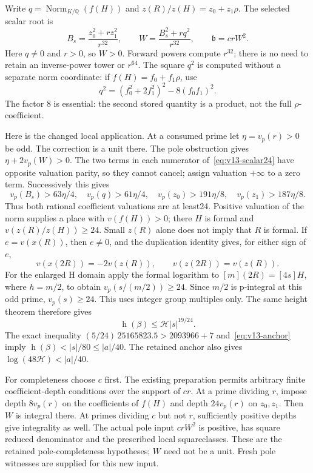 Write $q=\operatorname{Norm}_{K/\mathbb Q}(f(H))$ and
$z(R)/z(H)=z_0+z_1\rho$. The selected scalar root is
\begin{equation}\label{eq:v13-scalar24}
 B_s=\frac{z_0^2+r z_1^2}{r^{32}},\qquad
 W=\frac{B_s^2+r q^2}{r^{32}},\qquad \mathfrak b=crW^2.
\end{equation}
Here $q\ne0$ and $r>0$, so $W>0$. Forward powers compute $r^{32}$;
there is no need to retain an inverse-power tower or $r^{64}$.
The square $q^2$ is computed without a separate norm coordinate:
if $f(H)=f_0+f_1\rho$, use
\[
 q^2=(f_0^2+2f_1^2)^2-8(f_0f_1)^2.
\]
The factor $8$ is essential: the second stored quantity is a product,
not the full $\rho$-coefficient.

Here is the changed local application. At a consumed prime let
$\eta=v_p(r)>0$ be odd. The correction is a unit there.
The pole obstruction gives $\eta+2v_p(W)>0$.
The two terms in each numerator of~\eqref{eq:v13-scalar24} have
opposite valuation parity, so they cannot cancel; assign valuation
$+\infty$ to a zero term. Successively this gives
\[
 v_p(B_s)>63\eta/4,\quad v_p(q)>61\eta/4,\quad
 v_p(z_0)>191\eta/8,\quad v_p(z_1)>187\eta/8.
\]
Thus both rational coefficient valuations are at least24.
Positive valuation of the norm supplies a place with $v(f(H))>0$;
there $H$ is formal and $v(z(R)/z(H))\ge24$.
Small $z(R)$ alone does not imply that $R$ is formal. If $e=v(x(R))$,
then $e\ne0$, and the duplication identity gives, for either sign of $e$,
\[
 v(x(2R))=-2v(z(R)),\qquad v(z(2R))=v(z(R)).
\]
For the enlarged H domain apply the formal logarithm to
$[m](2R)=[4s]H$, where $h=m/2$, to obtain
$v_p(s/(m/2))\ge24$. Since $m/2$ is p-integral at this odd prime,
$v_p(s)\ge24$. This uses integer group multiples only.
The same height theorem therefore gives
\[
 \operatorname h(\beta)\le\mathcal H|s|^{19/24}.
\]
The exact inequality
$(5/24)\,25165823.5>2093966+7$ and~\eqref{eq:v13-anchor} imply
$\operatorname h(\beta)<|s|/80\le|a|/40$.
The retained anchor also gives $\log(48\mathcal H)<|a|/40$.

For completeness choose $c$ first. The existing preparation permits
arbitrary finite coefficient-depth conditions over the support of $cr$.
At a prime dividing $r$, impose depth $8v_p(r)$ on the coefficients of
$f(H)$ and depth $24v_p(r)$ on $z_0,z_1$. Then $W$ is integral there.
At primes dividing $c$ but not $r$, sufficiently positive depths give
integrality as well. The actual pole input $crW^2$ is positive, has
square reduced denominator and the prescribed local squareclasses.
These are the retained pole-completeness hypotheses; $W$ need not be
a unit. Fresh pole witnesses are supplied for this new input.

